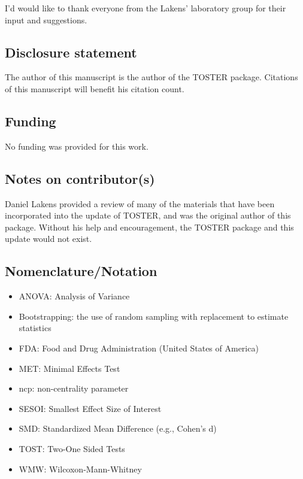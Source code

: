 \documentclass[
]{interact}
\providecommand{\tightlist}{%
  \setlength{\itemsep}{0pt}\setlength{\parskip}{0pt}}\usepackage{longtable,booktabs,array}
\begin{document}
I'd would like to thank everyone from the Lakens' laboratory group for
their input and suggestions.

\hypertarget{disclosure-statement}{%
\subsection*{Disclosure statement}\label{disclosure-statement}}

The author of this manuscript is the author of the TOSTER package.
Citations of this manuscript will benefit his citation count.

\hypertarget{funding}{%
\subsection*{Funding}\label{funding}}

No funding was provided for this work.

\hypertarget{notes-on-contributors}{%
\subsection*{Notes on contributor(s)}\label{notes-on-contributors}}

Daniel Lakens provided a review of many of the materials that have been
incorporated into the update of TOSTER, and was the original author of
this package. Without his help and encouragement, the TOSTER package and
this update would not exist.

\hypertarget{nomenclaturenotation}{%
\subsection*{Nomenclature/Notation}\label{nomenclaturenotation}}

\begin{itemize}
\tightlist
\item
  ANOVA: Analysis of Variance
\item
  Bootstrapping: the use of random sampling with replacement to estimate
  statistics
\item
  FDA: Food and Drug Administration (United States of America)
\item
  MET: Minimal Effects Test
\item
  ncp: non-centrality parameter
\item
  SESOI: Smallest Effect Size of Interest
\item
  SMD: Standardized Mean Difference (e.g., Cohen's d)
\item
  TOST: Two-One Sided Tests
\item
  WMW: Wilcoxon-Mann-Whitney
\end{itemize}
\end{document}
